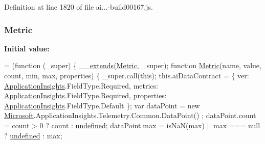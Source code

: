 Definition at line 1820 of file ai...-\/build00167.\+js.

\subsubsection[{\texorpdfstring{Metric}{Metric}}]{ Metric}\hypertarget{_scripts_2ai_80_822_89-build00167_8js_ac489226418fc3fc53d1daf8e6636b97d}{}\label{_scripts_2ai_80_822_89-build00167_8js_ac489226418fc3fc53d1daf8e6636b97d}
{\bfseries Initial value\+:}
\begin{DoxyCode}
= (\textcolor{keyword}{function} (\_super) \{
                \hyperlink{obj_2_release_2_package_2_package_tmp_2_scripts_2ai_80_822_89-build00167_8js_ac09f4951ac4b25df0272d4e78ff85ae0}{\_\_extends}(\hyperlink{obj_2_release_2_package_2_package_tmp_2_scripts_2ai_80_822_89-build00167_8js_ac489226418fc3fc53d1daf8e6636b97d}{Metric}, \_super);
                \textcolor{keyword}{function} \hyperlink{obj_2_release_2_package_2_package_tmp_2_scripts_2ai_80_822_89-build00167_8js_ac489226418fc3fc53d1daf8e6636b97d}{Metric}(name, value, count, min, max, properties) \{
                    \_super.call(\textcolor{keyword}{this});
                    this.aiDataContract = \{
                        ver: \hyperlink{obj_2_release_2_package_2_package_tmp_2_scripts_2ai_80_822_89-build00167_8js_aa415ef4f8cdd699689ef4b61db7656d8}{ApplicationInsights}.FieldType.Required,
                        metrics: \hyperlink{obj_2_release_2_package_2_package_tmp_2_scripts_2ai_80_822_89-build00167_8js_aa415ef4f8cdd699689ef4b61db7656d8}{ApplicationInsights}.FieldType.Required,
                        properties: \hyperlink{obj_2_release_2_package_2_package_tmp_2_scripts_2ai_80_822_89-build00167_8js_aa415ef4f8cdd699689ef4b61db7656d8}{ApplicationInsights}.FieldType.Default
                    \};
                    var dataPoint = \textcolor{keyword}{new} \hyperlink{obj_2_release_2_package_2_package_tmp_2_scripts_2ai_80_822_89-build00167_8js_af7b21097393c8dc2ece8949358ff0e27}{Microsoft}.ApplicationInsights.Telemetry.Common.DataPoint()
      ;
                    dataPoint.count = count > 0 ? count : \hyperlink{obj_2_release_2_package_2_package_tmp_2_scripts_2jquery-1_810_82_8js_a08113a236cc18d2a9d5ce27e638012be}{undefined};
                    dataPoint.max = isNaN(max) || max === null ? \hyperlink{obj_2_release_2_package_2_package_tmp_2_scripts_2jquery-1_810_82_8js_a08113a236cc18d2a9d5ce27e638012be}{undefined} : max;

\end{DoxyCode}
